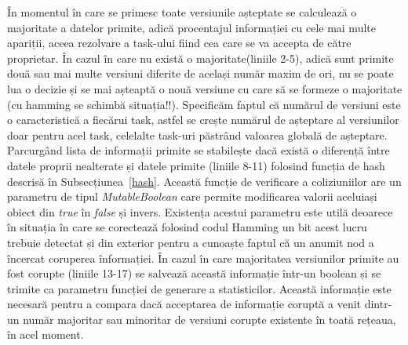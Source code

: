 \documentclass[12pt,a4paper]{report}
\begin{document}
În momentul în care se primesc toate versiunile așteptate se calculează o majoritate a datelor primite, adică procentajul informației cu cele mai multe apariții, aceea rezolvare a task-ului fiind cea care se va accepta de către proprietar. În cazul în care nu există o majoritate(liniile 2-5), adică sunt primite două sau mai multe versiuni diferite de același număr maxim de ori, nu se poate lua o decizie și se mai așteaptă o nouă versiune cu care să se formeze o majoritate (cu hamming se schimbă situația!!). Specificăm faptul că numărul de versiuni este o caracteristică a fiecărui task, astfel se crește numărul de așteptare al versiunilor doar pentru acel task, celelalte task-uri păstrând valoarea globală de așteptare. Parcurgând lista de informații primite se stabilește dacă există o diferență între datele proprii nealterate și datele primite (liniile 8-11) folosind funcția de hash descrisă în Subsecțiunea~\ref{hash}. Această funcție de verificare a coliziuniilor are un parametru de tipul \textit{MutableBoolean} care permite modificarea valorii aceluiași obiect din \textit{true} în \textit{false} și invers. Existența acestui parametru este utilă deoarece în situația în care se corectează folosind codul Hamming un bit acest lucru trebuie detectat și din exterior pentru a cunoaște faptul că un anumit nod a încercat coruperea înformației. În cazul în care majoritatea versiunilor primite au fost corupte (liniile 13-17) se salvează această informație într-un boolean și se trimite ca parametru funcției de generare a statisticilor. Această informație este necesară pentru a compara dacă acceptarea de informație coruptă a venit dintr-un număr majoritar sau minoritar de versiuni corupte existente în toată rețeaua, în acel moment.
\end{document}
